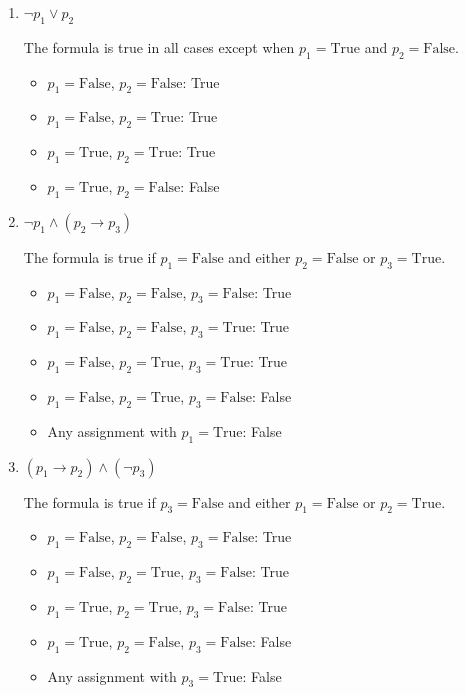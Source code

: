 \documentclass[11pt]{article}
\begin{document}
    \begin{enumerate}
        \item $\neg p_1 \vee p_2$

        The formula is true in all cases except when $p_1 = \text{True}$ and $p_2 = \text{False}$.
        \begin{itemize}
            \item $p_1 = \text{False}$, $p_2 = \text{False}$: True
            \item $p_1 = \text{False}$, $p_2 = \text{True}$: True
            \item $p_1 = \text{True}$, $p_2 = \text{True}$: True
            \item $p_1 = \text{True}$, $p_2 = \text{False}$: False
        \end{itemize}

        \item $\neg p_1 \wedge (p_2 \rightarrow p_3)$

        The formula is true if $p_1 = \text{False}$ and either $p_2 = \text{False}$ or $p_3 = \text{True}$.
        \begin{itemize}
            \item $p_1 = \text{False}$, $p_2 = \text{False}$, $p_3 = \text{False}$: True
            \item $p_1 = \text{False}$, $p_2 = \text{False}$, $p_3 = \text{True}$: True
            \item $p_1 = \text{False}$, $p_2 = \text{True}$, $p_3 = \text{True}$: True
            \item $p_1 = \text{False}$, $p_2 = \text{True}$, $p_3 = \text{False}$: False
            \item Any assignment with $p_1 = \text{True}$: False
        \end{itemize}

        \item $(p_1 \rightarrow p_2) \wedge (\neg p_3)$

        The formula is true if $p_3 = \text{False}$ and either $p_1 = \text{False}$ or $p_2 = \text{True}$.
        \begin{itemize}
            \item $p_1 = \text{False}$, $p_2 = \text{False}$, $p_3 = \text{False}$: True
            \item $p_1 = \text{False}$, $p_2 = \text{True}$, $p_3 = \text{False}$: True
            \item $p_1 = \text{True}$, $p_2 = \text{True}$, $p_3 = \text{False}$: True
            \item $p_1 = \text{True}$, $p_2 = \text{False}$, $p_3 = \text{False}$: False
            \item Any assignment with $p_3 = \text{True}$: False
        \end{itemize}
    \end{enumerate}
\end{document}
